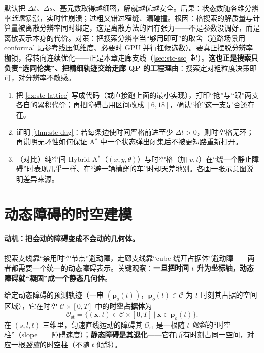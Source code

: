 \begin{pitfall}
默认把 $\Delta t$、$\Delta s$、基元数取得越细密，解就越优越安全。后果：状态数随各维分辨率\emph{连乘}暴涨，实时性崩溃；过粗又错过窄缝、漏碰撞。根因：格搜索的解质量与计算量被离散分辨率同时绑定，这是离散方法的固有张力——不是参数没调好，而是离散表示本身的代价。对策：把搜索分辨率当“够用即可”的取舍（道路场景用 conformal 贴参考线压低维度\cite{mcnaughton2011lattice}、必要时 GPU 并行扛候选数）。要真正摆脱分辨率枷锁，得转向连续优化——正是本章走廊支线（\cref{sec:stc-ssc} 起）。\textbf{这也正是搜索只负责“选同伦类”、把精细轨迹交给走廊 QP 的工程理由}：搜索定对粗粒度决策即可，对分辨率不敏感。
\end{pitfall}

\begin{practice}
\begin{enumerate}
  \item 把 \cref{ex:stc-lattice} 写成代码（或直接跑上面的最小实现），打印“抢”与“跟”两支各自的累积代价；再把障碍占用区间改成 $[6,18]$，确认“抢”这一支是否还存在。
  \item 证明 \cref{thm:stc-dag}：若每条边使时间严格前进至少 $\Delta t>0$，则时空格无环；再说明无环性如何保证 A$^*$ 中一个状态弹出闭集后不被更短路重新打开。
  \item （对比）纯空间 Hybrid A$^*$（$(x,y,\theta)$）与时空格（加 $v,t$）在“绕一个静止障碍”时表现几乎一样、在“避一辆横穿的车”时却天差地别。各画一张示意图说明差异来源。
\end{enumerate}
\end{practice}

\section{动态障碍的时空建模}
\label{sec:stc-dynobs}

\paragraph{动机：把会动的障碍变成不会动的几何体。}
搜索支线靠“禁用时空节点”避动障，走廊支线靠“cube 绕开占据体”避动障——两者都需要一个统一的动态障碍表示。关键观察：\textbf{一旦把时间 $t$ 升为坐标轴，动态障碍就“凝固”成一个静态几何体}。

\begin{definition}[时空占据体与时空柱]\label{def:stc-stcolumn}
给定动态障碍的预测轨迹（一串 $(\mathbf{p}_o(t))$，$\mathbf{p}_o(t)\in\mathcal{C}$ 为 $t$ 时刻其占据的空间区域），它在时空 $\mathcal{C}\times[0,T]$ 中的\textbf{时空占据体}为
\begin{equation}
  \mathcal{O}_{\mathrm{st}}=\big\{(\mathbf{x},t)\in\mathcal{C}\times[0,T]\ \big|\ \mathbf{x}\in\mathbf{p}_o(t)\big\}.
  \label{eq:stc-occ}
\end{equation}
在 $(s,l,t)$ 三维里，匀速直线运动的障碍其 $\mathcal{O}_{\mathrm{st}}$ 是一根随 $t$ \emph{倾斜}的“时空柱”（slope $=$ 障碍速度）；\textbf{静态障碍是其退化}——它在所有时刻占同一空间，对应一根\emph{竖直}的时空柱（不随 $t$ 倾斜）。
\end{definition}

